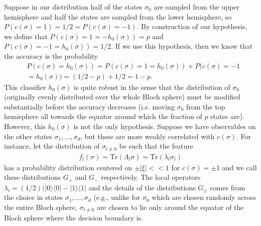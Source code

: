 \documentclass[onecolumn,prx, superscriptaddress,longbibliography,margin=1mm 11pt]{revtex4-2}
\begin{document}
      Suppose in our distribution half of the states $\sigma_0$ are sampled from the upper hemisphere and half the states are sampled from the lower hemisphere, so $P(c(\sigma)=1)=1/2=P(c(\sigma)=-1)$. By construction of our hypothesis, we define that $P(c(\sigma)=1=-h_0(\sigma))=p$ and $P(c(\sigma)=-1=h_0(\sigma))=1/2$. If we use this hypothesis, then we know that the accuracy is the probability
      \begin{align}   & P(c(\sigma)=h_0(\sigma))=P(c(\sigma)=1=h_0(\sigma))+P(c(\sigma)=-1 \nonumber \\
      &=h_0(\sigma))=(1/2-p)+1/2=1-p.
      \end{align}
     This classifier $h_0(\sigma)$ is quite robust in the sense that the distribution of $\sigma_0$ (originally evenly distributed over the whole Bloch sphere) must be modified substantially before the accuracy decreases (i.e. moving $\sigma_0$ from the top hemisphere all towards the equator around which the fraction of $p$ states are). \\
     
     However, this $h_0(\sigma)$ is not the only hypothesis. Suppose we have observables on the other states $\sigma_1,...,\sigma_d$, but these are more weakly correlated with $c(\sigma)$. For instance, let the distribution of $\sigma_{l \neq 0}$ be such that the feature
     \begin{align}
         f_l(\sigma)=\text{Tr}(\Lambda_l \sigma)=\text{Tr}(\lambda_l \sigma_l)
     \end{align}
     has a probability distribution centered on $\pm|\xi|<<1$ for $c(\sigma)=\pm 1$ and we call these distributions $G_+$ and $G_-$ respectively. The local operators $\lambda_l=(1/2)(|0\rangle \langle 0|-|1\rangle \langle 1|$ and the details of the distributions $G_{\pm}$ comes from the choice in states $\sigma_1,...,\sigma_d$ (e.g., unlike for $\sigma_0$ which are chosen randomly across the entire Bloch sphere, $\sigma_{l \neq 0}$ are chosen to lie only around the equator of the Bloch sphere where the decision boundary is.\\
     
\end{document}

